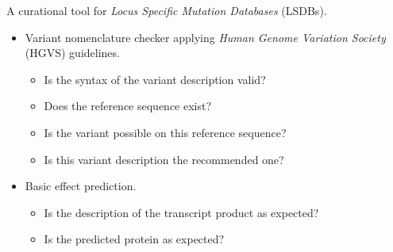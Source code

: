 \documentclass[a4, portrait]{seminar}
\newcommand{\bt}[1]{\texttt{\textbf{#1}}}
\begin{document}
\providecommand{\positionshiftexampleheader}{
  We observe a change from \bt{GG\underline{ATCATC}G} to 
  \bt{GG\underline{ATCATCATC}G}.

}

\providecommand{\positionshiftexamplebody}{
  \bt{\,123456789}
  \vspace{-0.3cm}

  \bt{GGATCATCG}

}

\providecommand{\inversionexampleheader}{
  We observe a change from \bt{GCT\underline{TTAATT}AGG} to 
  \bt{GCT\underline{AATTAA}AGG}.

}


\begin{slide}
  
  A curational tool for \emph{Locus Specific Mutation Databases} (LSDBs).
  
  \bigskip
  \begin{itemize}
    \item Variant nomenclature checker applying \emph{Human Genome Variation
          Society} (HGVS) guidelines.
    \begin{itemize}
      \item Is the syntax of the variant description valid?
      \item Does the reference sequence exist?
      \item Is the variant possible on this reference sequence?
      \item Is this variant description the recommended one?
    \end{itemize}
    \item Basic effect prediction.
    \begin{itemize}
      \item Is the description of the transcript product as expected?
      \item Is the predicted protein as expected?
    \end{itemize}
  \end{itemize}
  \vfill
\end{slide}
\end{document}
